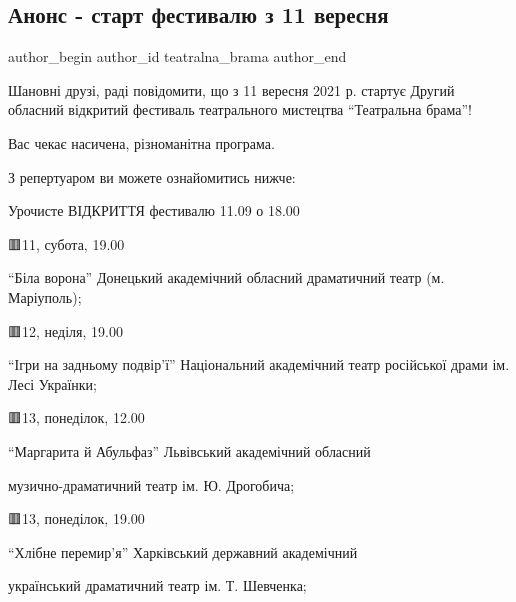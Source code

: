 
 
 
 
 

\subsection{Анонс - старт фестивалю з 11 вересня}
\label{sec:06_08_2021.fb.teatralna_brama.1.anons_start_festivalu_z_11_veresnja_2021}

\ifcmt
 author_begin
   author_id teatralna_brama
 author_end
\fi

Шановні друзі, раді повідомити, що з 11 вересня 2021 р. стартує Другий обласний
відкритий фестиваль театрального мистецтва \enquote{Театральна брама}!


Вас чекає насичена, різноманітна програма. 

З репертуаром ви можете ознайомитись нижче:

Урочисте ВІДКРИТТЯ фестивалю 11.09 о 18.00

🟥11, субота, 19.00 

 \enquote{Біла ворона} Донецький академічний обласний драматичний театр (м. Маріуполь);

🟥12, неділя, 19.00 

\enquote{Ігри на задньому подвір'ї} Національний академічний театр російської драми ім.
Лесі Українки;

🟥13, понеділок, 12.00

 \enquote{Маргарита й Абульфаз} Львівський академічний обласний\par\noindent музично-драматичний
 театр ім. Ю. Дрогобича; 

🟥13, понеділок, 19.00 

\enquote{Хлібне перемир'я} Харківський державний академічний\par\noindent український драматичний
театр ім. Т. Шевченка;

